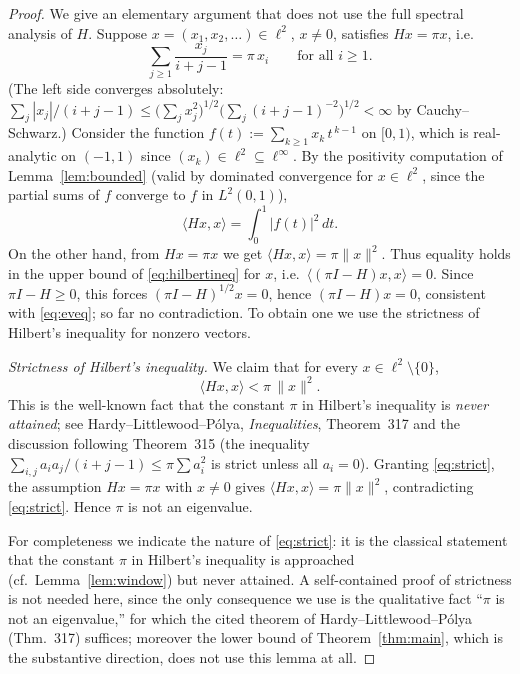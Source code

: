 \documentclass[12pt]{article}
\theoremstyle{remark}
\begin{document}
\begin{proof}
We give an elementary argument that does not use the full spectral analysis of $H$.
Suppose $x=(x_1,x_2,\dots)\in\ell^2$, $x\ne0$, satisfies $Hx=\pi x$, i.e.
\begin{equation}\label{eq:eveq}
\sum_{j\ge1}\frac{x_j}{i+j-1}=\pi\,x_i\qquad\text{for all }i\ge1 .
\end{equation}
(The left side converges absolutely: $\sum_j |x_j|/(i+j-1)\le\bigl(\sum_j x_j^2\bigr)^{1/2}
\bigl(\sum_j (i+j-1)^{-2}\bigr)^{1/2}<\infty$ by Cauchy--Schwarz.)
Consider the function $f(t):=\sum_{k\ge1}x_k\,t^{\,k-1}$ on $[0,1)$, which is real-analytic on
$(-1,1)$ since $(x_k)\in\ell^2\subseteq\ell^\infty$. By the positivity computation of
Lemma~\ref{lem:bounded} (valid by dominated convergence for $x\in\ell^2$, since the partial sums
of $f$ converge to $f$ in $L^2(0,1)$),
\[
\langle Hx,x\rangle=\int_0^1 |f(t)|^2\,dt .
\]
On the other hand, from $Hx=\pi x$ we get $\langle Hx,x\rangle=\pi\|x\|^2$. Thus equality holds in
the upper bound of \eqref{eq:hilbertineq} for $x$, i.e.\ $\langle (\pi I-H)x,x\rangle=0$. Since
$\pi I-H\ge0$, this forces $(\pi I-H)^{1/2}x=0$, hence $(\pi I-H)x=0$, consistent with
\eqref{eq:eveq}; so far no contradiction. To obtain one we use the strictness of Hilbert's
inequality for nonzero vectors.

\emph{Strictness of Hilbert's inequality.} We claim that for every $x\in\ell^2\setminus\{0\}$,
\begin{equation}\label{eq:strict}
\langle Hx,x\rangle<\pi\,\|x\|^2 .
\end{equation}
This is the well-known fact that the constant $\pi$ in Hilbert's inequality is \emph{never
attained}; see Hardy--Littlewood--P\'olya, \emph{Inequalities}, Theorem~317 and the discussion
following Theorem~315 (the inequality $\sum_{i,j}a_ia_j/(i+j-1)\le\pi\sum a_i^2$ is strict unless
all $a_i=0$). Granting \eqref{eq:strict}, the assumption $Hx=\pi x$ with $x\ne0$ gives
$\langle Hx,x\rangle=\pi\|x\|^2$, contradicting \eqref{eq:strict}. Hence $\pi$ is not an
eigenvalue.

For completeness we indicate the nature of \eqref{eq:strict}: it is the classical statement that
the constant $\pi$ in Hilbert's inequality is approached (cf.\ Lemma~\ref{lem:window}) but never
attained. A self-contained proof of strictness is not needed here, since the only consequence we
use is the qualitative fact ``$\pi$ is not an eigenvalue,'' for which the cited theorem of
Hardy--Littlewood--P\'olya (Thm.~317) suffices; moreover the lower bound of
Theorem~\ref{thm:main}, which is the substantive direction, does not use this lemma at all.
\end{proof}
\end{document}
